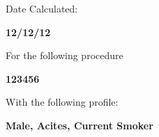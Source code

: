 \documentclass[
  11pt,
  landscape]{article}
\begin{document}
\begin{flushright}
\vspace{-16.5cm} \hspace{18cm} \normalsize Date Calculated:

\vspace{-0.25 cm} \hspace{18cm} \normalsize \textbf{12/12/12}

\vspace{-0.2cm} \hspace{18cm} \normalsize For the following procedure

\vspace{-0.2cm} \hspace{18cm} \small \textbf{123456}

\vspace{-0.2cm} \hspace{18cm} \normalsize With the following profile:

\vspace{-0.2cm} \hspace{18cm} \small \textbf{Male, Acites, Current Smoker}
\end{flushright}
\end{document}
